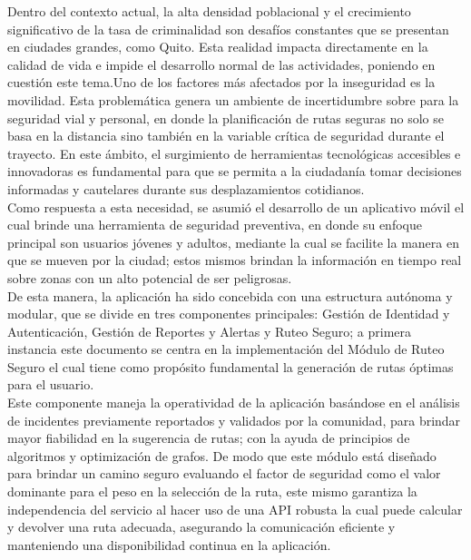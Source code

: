 Dentro del contexto actual, la alta densidad poblacional y el crecimiento significativo de la tasa de criminalidad son desafíos constantes que se presentan en ciudades grandes, como Quito. Esta realidad impacta directamente en la calidad de vida e impide el desarrollo normal de las actividades, poniendo en cuestión este tema.Uno de los factores más afectados por la inseguridad es la movilidad. 
Esta problemática genera un ambiente de incertidumbre sobre para la seguridad vial y personal, en donde la planificación de rutas seguras no solo se basa en la distancia sino también en la variable crítica de seguridad durante el trayecto. En este ámbito, el surgimiento de herramientas tecnológicas accesibles e innovadoras es fundamental para que se permita a la ciudadanía tomar decisiones informadas y cautelares durante sus desplazamientos cotidianos.
\\
Como respuesta a esta necesidad, se asumió el desarrollo de un aplicativo móvil el cual brinde una herramienta de seguridad preventiva, en donde su enfoque principal son usuarios jóvenes y adultos, mediante la cual se facilite la manera en que se mueven por la ciudad; estos mismos brindan la información en tiempo real sobre zonas con un alto potencial de ser peligrosas.
\\
De esta manera, la aplicación ha sido concebida con una estructura autónoma y modular, que se divide en tres componentes principales: Gestión de Identidad y Autenticación, Gestión de Reportes y Alertas y Ruteo Seguro; a primera instancia este documento se centra en la implementación del Módulo de Ruteo Seguro el cual tiene como propósito fundamental la generación de rutas óptimas para el usuario.
\\
Este componente maneja la operatividad de la aplicación basándose en el análisis de incidentes previamente reportados y validados por la comunidad, para brindar mayor fiabilidad en la sugerencia de rutas; con la ayuda de principios de algoritmos y optimización de grafos. De modo que este módulo está diseñado para brindar un camino seguro evaluando el factor de seguridad como el valor dominante para el peso en la selección de la ruta, este mismo garantiza la independencia del servicio al hacer uso de una API robusta la cual puede calcular y devolver una ruta adecuada, asegurando la comunicación eficiente y manteniendo una disponibilidad continua en la aplicación.

